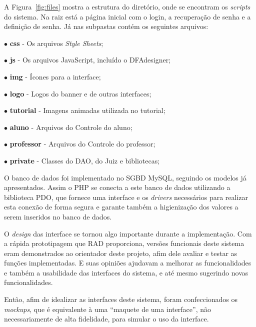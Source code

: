 \documentclass[
	12pt,				%
	openany,
	oneside,
	a4paper,			%
	english,			%
	brazil				%
	]{abntex2}
\begin{document}
  A Figura~\ref{fig:files} mostra a estrutura do diretório, onde se encontram os \textit{scripts} do sistema. Na raiz está a página inicial com o login, a recuperação de senha e a definição de senha. Já nas subpastas contém os seguintes arquivos:
  
 \begin{alineas}
   \item[$\bullet$] \textbf{css} - Os arquivos \textit{Style Sheets};
   \item[$\bullet$] \textbf{js} - Os arquivos JavaScript, incluído o DFAdesigner;
   \item[$\bullet$] \textbf{img} - Ícones para a interface;
   \item[$\bullet$] \textbf{logo} - Logos do banner e de outras interfaces;
   \item[$\bullet$] \textbf{tutorial} - Imagens animadas utilizada no tutorial;
   \item[$\bullet$] \textbf{aluno} - Arquivos do Controle do aluno;
   \item[$\bullet$] \textbf{professor} - Arquivos do Controle do professor;
   \item[$\bullet$] \textbf{private} - Classes do DAO, do Juiz e bibliotecas;
 \end{alineas}

  O banco de dados foi implementado no SGBD MySQL, seguindo os modelos já apresentados. Assim o PHP se conecta a este banco de dados utilizando a biblioteca PDO, que fornece uma interface e os \textit{drivers} necessários para realizar esta conexão de forma segura e garante também a higienização dos valores a serem inseridos no banco de dados.
  
  O \textit{design} das interface se tornou algo importante durante a implementação. Com a rápida prototipagem que RAD proporciona, versões funcionais deste sistema eram demonstrados ao orientador deste projeto, afim dele avaliar e testar as funções implementadas. E suas opiniões ajudavam a melhorar as funcionalidades e também a usabilidade das interfaces do sistema, e até mesmo sugerindo novas funcionalidades.
  
  Então, afim de idealizar as interfaces deste sistema, foram confeccionados os \textit{mockups}, que é equivalente à uma ``maquete de uma interface'', não necessariamente de alta fidelidade, para simular o uso da interface.
  
\end{document}
